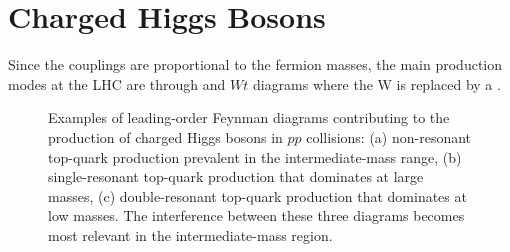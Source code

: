 \section{Charged Higgs Bosons}\label{sec:Hpm}
	Since the \Hpm couplings are proportional to the fermion masses, the main production modes at the LHC are through \ttbar and $Wt$ diagrams where the W is replaced by a \Hpm.
	\begin{figure}[!ht]
		\centering
		\caption{\label{fig:hpm-diagrams} Examples of leading-order Feynman diagrams contributing to the production of charged Higgs bosons in $pp$ collisions: (a) non-resonant top-quark production prevalent in the intermediate-mass range, (b) single-resonant top-quark production that dominates at large \Hpm masses, (c) double-resonant top-quark production that dominates at low \Hpm masses. The interference between these three diagrams becomes most relevant in the intermediate-mass region.}
	\end{figure}
